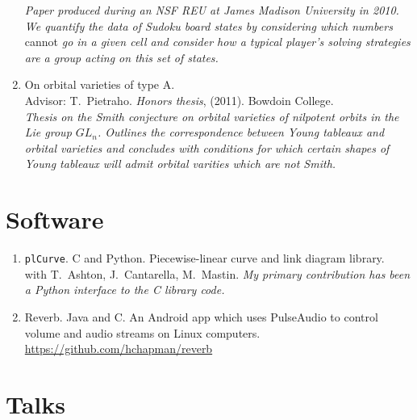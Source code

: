 \documentclass[letterpaper]{article}
\begin{document}
\begin{enumerate}
  \textit{Paper produced during an NSF REU at James Madison University
    in 2010. We quantify the data of Sudoku board states by
    considering which numbers} cannot \textit{go in a given cell and
    consider how a typical player's solving strategies are a group
    acting on this set of states.}
\item On orbital varieties of type A. \\
  Advisor: T.\ Pietraho. \textit{Honors thesis}, (2011). Bowdoin
  College.\\
  \textit{Thesis on the Smith conjecture on orbital varieties of
    nilpotent orbits in the Lie group $GL_n$.  Outlines the
    correspondence between Young tableaux and orbital varieties and
    concludes with conditions for which certain shapes of Young
    tableaux will admit orbital varities which are not Smith.}
\end{enumerate}

\section*{Software}

\begin{enumerate}
\item \texttt{plCurve}. C and Python. Piecewise-linear curve and link diagram library.\\
  with T.\ Ashton, J.\ Cantarella, M.\ Mastin.
  \textit{My primary contribution has been a Python interface to the C
  library code.}
\item Reverb. Java and C. An Android app which uses PulseAudio to
  control volume and audio streams on Linux computers. \\
  \url{https://github.com/hchapman/reverb}
\end{enumerate}

\section*{Talks}
\end{document}
